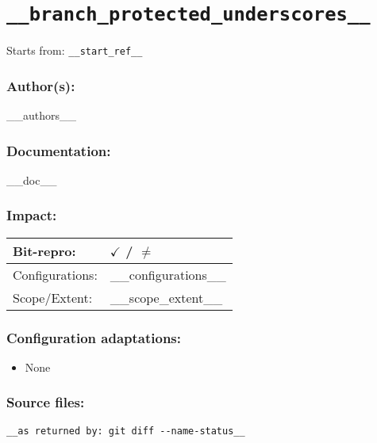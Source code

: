 \newpage
\section{\texttt{__branch_protected_underscores__}}
\label{branch:__branch__}
Starts from: \texttt{__start_ref__}

\subsubsection*{Author(s):}
__authors__

\subsubsection*{Documentation:}
__doc__

\subsubsection*{Impact:}
\begin{tabular}{|l|l|}
 \hline
 Bit-repro: & $\checkmark$ / $\neq$\\ \hline
 Configurations: & __configurations__\\ \hline
 Scope/Extent: & __scope_extent__\\
 \hline
\end{tabular}

\subsubsection*{Configuration adaptations:}
\begin{itemize}
 \item None 
\end{itemize}

\subsubsection*{Source files:}
\begin{lstlisting}
__as returned by: git diff --name-status__
\end{lstlisting}
